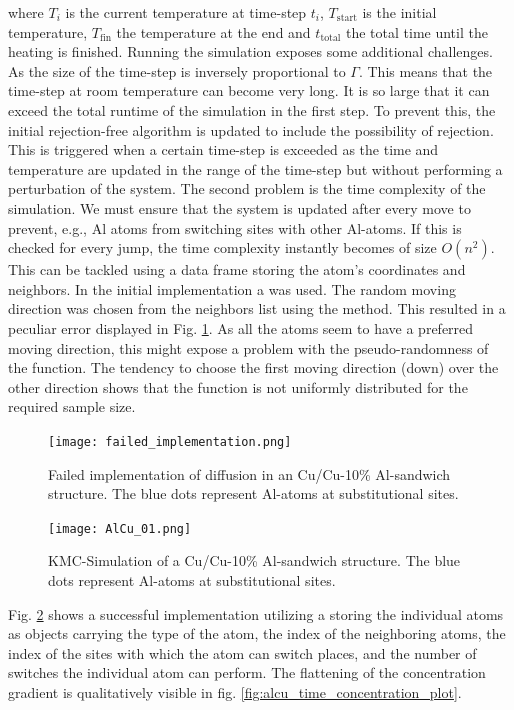 where \(T_{i}\) is the current temperature at time-step \(t_{i}\), \( T_{\mathrm{start}}\) is the initial temperature, \(T_{\mathrm{fin}}\) the temperature at the end and \(t_{\mathrm{total}}\) the total time until the heating is finished. 
Running the simulation exposes some additional challenges. As the size of the time-step is inversely proportional to \(\Gamma\). This means that the time-step at room temperature can become very long. It is so large that it can exceed the total runtime of the simulation in the first step. To prevent this, the initial rejection-free algorithm is updated to include the possibility of rejection. This is triggered when a certain time-step is exceeded as the time and temperature are updated in the range of the time-step but without performing a perturbation of the system. The second problem is the time complexity of the simulation.  We must ensure that the system is updated after every move to prevent, e.g., Al atoms from switching sites with other Al-atoms. If this is checked for every jump, the time complexity instantly becomes of size \(O(n^{2})\). This can be tackled using a data frame storing the atom's coordinates and neighbors. In the initial implementation a  was used. The random moving direction was chosen from the neighbors list using the  method. This resulted in a peculiar error displayed in Fig. \ref{fig:failed_implementation}. As all the atoms seem to have a preferred moving direction, this might expose a problem with the pseudo-randomness of the  function. The tendency to choose the first moving direction (down) over the other direction shows that the function is not uniformly distributed for the required sample size.

\begin{figure}[htb]
	\centering
	\texttt{[image: failed\_implementation.png]}\label{fig:failed_implementation}
	\caption{Failed implementation of diffusion in an Cu/Cu-10\% Al-sandwich structure. The blue dots represent Al-atoms at substitutional sites. }
\end{figure}

\begin{figure}[htb]
	\centering
	\texttt{[image: AlCu\_01.png]}\label{fig:Al_Cu_sandwich_time}
	\caption{KMC-Simulation of a Cu/Cu-10\% Al-sandwich structure. The blue dots represent Al-atoms at substitutional sites. }
\end{figure}

Fig. \ref{fig:Al_Cu_sandwich_time} shows a successful implementation utilizing a  storing the individual atoms as objects carrying the type of the atom, the index of the neighboring atoms, the index of the sites with which the atom can switch places, and the number of switches the individual atom can perform. The flattening of the concentration gradient is qualitatively visible in fig. \ref{fig:alcu_time_concentration_plot}.

